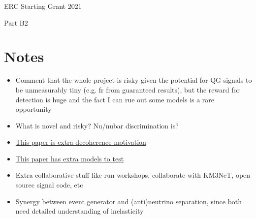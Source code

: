 \documentclass[a4paper,11pt]{article}
\newcommand\BackImage[2][scale=1]{%
\BgThispage
\backgroundsetup{
  contents={\texttt{[image: \#2]}}
  }
}
\newcounter{bar}
\begin{document}

\renewcommand{\headrulewidth}{0pt}

\pagestyle{fancyplain}


\centerline{\huge ERC Starting Grant 2021}
\centerline{\huge Part B2}

\vspace{0.5cm}
%
%
  


\section{Notes}
\vspace{0.1 cm}

\begin{itemize}
    \item Comment that the whole project is risky given the potential for QG signals to be unmeasurably tiny (e.g. fr from guaranteed results), but the reward for  detection is huge and the fact I can rue out some models is a rare opportunity
    \item What is novel and risky? Nu/nubar discrimination is?
    \item \href{https://arxiv.org/pdf/2103.11984.pdf}{This paper is extra decoherence motivation}
    \item \href{https://arxiv.org/pdf/0806.0339.pdf}{This paper has extra models to test}
    \item Extra collaborative stuff like run workshops, collaborate with KM3NeT, open sourec signal code, etc
    \item Synergy between event generator and (anti)neutrino separation, since both need detailed understanding of inelasticity
\end{itemize}
\end{document}
